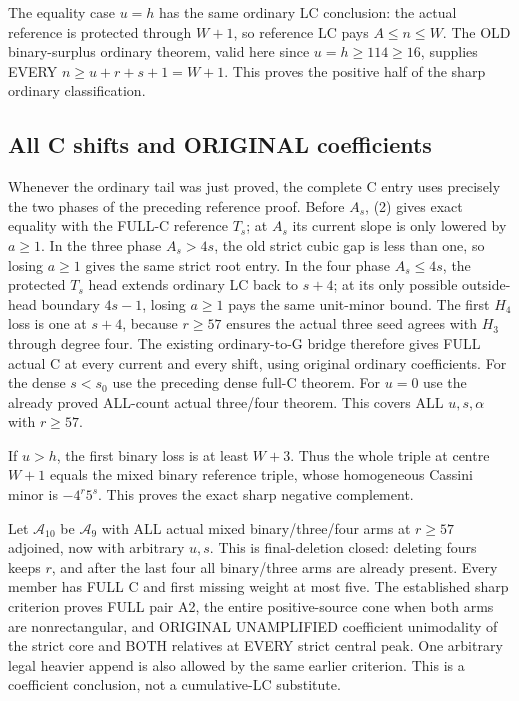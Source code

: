 The equality case $u=h$ has the same ordinary LC conclusion:
the actual reference is protected through $W+1$, so reference LC
pays $A\le n\le W$. The OLD binary-surplus ordinary theorem,
valid here since $u=h\ge114\ge16$, supplies EVERY $n\ge u+r+s+1=W+1$.
This proves the positive half of the sharp ordinary classification.

\subsection{All C shifts and ORIGINAL coefficients}
Whenever the ordinary tail was just proved, the complete C entry
uses precisely the two phases of the preceding reference proof.
Before $A_s$, (2) gives exact equality with the FULL-C reference
$T_s$; at $A_s$ its current slope is only lowered by $a\ge1$.
In the three phase $A_s>4s$, the old strict cubic gap is less than
one, so losing $a\ge1$ gives the same strict root entry.
In the four phase $A_s\le4s$, the protected $T_s$ head extends
ordinary LC back to $s+4$; at its only possible outside-head
boundary $4s-1$, losing $a\ge1$ pays the same unit-minor bound.
The first $H_4$ loss is one at $s+4$, because $r\ge57$ ensures
the actual three seed agrees with $H_3$ through degree four.
The existing ordinary-to-G bridge therefore gives FULL actual C
at every current and every shift, using original ordinary coefficients.
For the dense $s<s_0$ use the preceding dense full-C theorem.
For $u=0$ use the already proved ALL-count actual three/four theorem.
This covers ALL $u,s,\alpha$ with $r\ge57$.

If $u>h$, the first binary loss is at least $W+3$.
Thus the whole triple at centre $W+1$ equals the mixed binary
reference triple, whose homogeneous Cassini minor is
$-4^r5^s$. This proves the exact sharp negative complement.

Let $\mathcal A_{10}$ be $\mathcal A_9$ with ALL actual mixed
binary/three/four arms at $r\ge57$ adjoined, now with arbitrary
$u,s$. This is final-deletion closed: deleting fours keeps $r$,
and after the last four all binary/three arms are already present.
Every member has FULL C and first missing weight at most five.
The established sharp criterion proves FULL pair A2, the entire
positive-source cone when both arms are nonrectangular, and
ORIGINAL UNAMPLIFIED coefficient unimodality of the strict core
and BOTH relatives at EVERY strict central peak. One arbitrary
legal heavier append is also allowed by the same earlier criterion.
This is a coefficient conclusion, not a cumulative-LC substitute.

